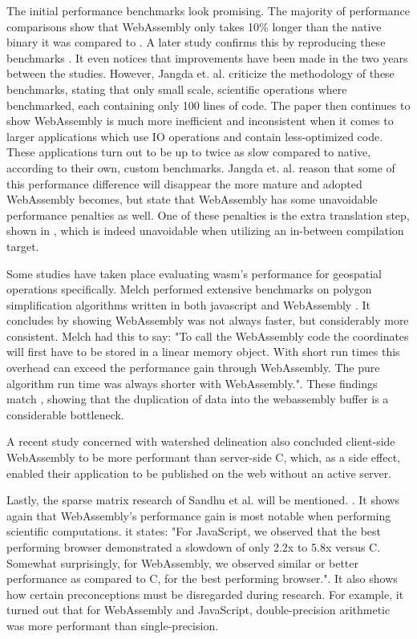 The initial performance benchmarks look promising. The majority of performance comparisons show that WebAssembly only takes 10\% longer than the native binary it was compared to \cite{haas_bringing_2017}. A later study confirms this by reproducing these benchmarks \cite{jangda_not_2019}. It even notices that improvements have been made in the two years between the studies. However, Jangda et. al. criticize the methodology of these benchmarks, stating that only small scale, scientific operations where benchmarked, each containing only 100 lines of code. The paper then continues to show WebAssembly is much more inefficient and inconsistent when it comes to larger applications which use IO operations and contain less-optimized code. These applications turn out to be up to twice as slow compared to native, according to their own, custom benchmarks. 
Jangda et. al. reason that some of this performance difference will disappear the more mature and adopted WebAssembly becomes, but state that WebAssembly has some unavoidable performance penalties as well. 
One of these penalties is the extra translation step, shown in , which is indeed unavoidable when utilizing an in-between compilation target. 

Some studies have taken place evaluating \ac{wasm}'s performance for geospatial operations specifically. 
Melch performed extensive benchmarks on polygon simplification algorithms written in both javascript and WebAssembly \cite{melch_performance_2019}. 
It concludes by showing WebAssembly was not always faster, but considerably more consistent. 
Melch had this to say: "To call the WebAssembly code the coordinates will first have to be stored in a linear memory object. 
With short run times this overhead can exceed the performance gain through WebAssembly. 
The pure algorithm run time was always shorter with WebAssembly.". 
These findings match \cite{jangda_not_2019}, showing that the duplication of data into the webassembly buffer is a considerable bottleneck.

A recent study concerned with watershed delineation \cite{sit_optimized_2019} also concluded client-side WebAssembly to be more performant than server-side C, which, as a side effect, enabled their application to be published on the web without an active server. 

Lastly, the sparse matrix research of Sandhu et al. will be mentioned. \cite{sandhu_sparse_2018}. It shows again that WebAssembly's performance gain is most notable when performing scientific computations. it states: "For JavaScript, we observed that the best performing browser demonstrated a slowdown of only 2.2x to 5.8x versus C. Somewhat surprisingly, for WebAssembly, we observed similar or better performance as compared to C, for the best performing browser.". It also shows how certain preconceptions must be disregarded during research. For example, it turned out that for WebAssembly and JavaScript, double-precision arithmetic was more performant than single-precision.

